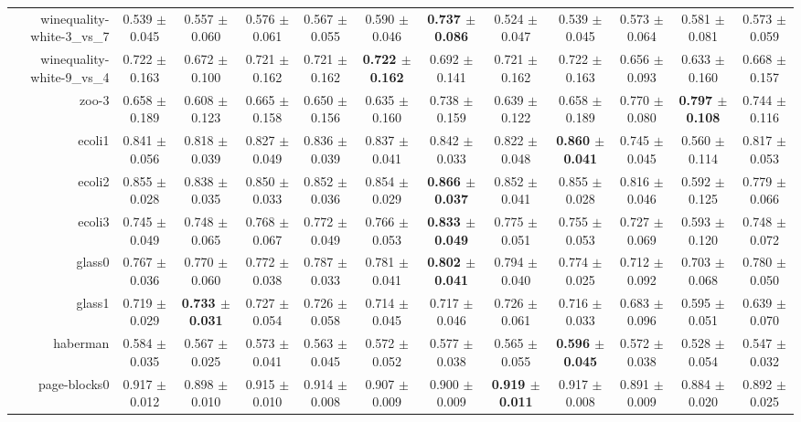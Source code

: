\begin{table}[!ht]
{\begin{tabular}{r c c c c c c c c c c c}
winequality-white-3\_vs\_7 & 0.539 $\pm$ 0.045 & 0.557 $\pm$ 0.060 & 0.576 $\pm$ 0.061 & 0.567 $\pm$ 0.055 & 0.590 $\pm$ 0.046 & \textbf{0.737 $\pm$ 0.086} & 0.524 $\pm$ 0.047 & 0.539 $\pm$ 0.045 & 0.573 $\pm$ 0.064 & 0.581 $\pm$ 0.081 & 0.573 $\pm$ 0.059 \\
winequality-white-9\_vs\_4 & 0.722 $\pm$ 0.163 & 0.672 $\pm$ 0.100 & 0.721 $\pm$ 0.162 & 0.721 $\pm$ 0.162 & \textbf{0.722 $\pm$ 0.162} & 0.692 $\pm$ 0.141 & 0.721 $\pm$ 0.162 & 0.722 $\pm$ 0.163 & 0.656 $\pm$ 0.093 & 0.633 $\pm$ 0.160 & 0.668 $\pm$ 0.157 \\
zoo-3 & 0.658 $\pm$ 0.189 & 0.608 $\pm$ 0.123 & 0.665 $\pm$ 0.158 & 0.650 $\pm$ 0.156 & 0.635 $\pm$ 0.160 & 0.738 $\pm$ 0.159 & 0.639 $\pm$ 0.122 & 0.658 $\pm$ 0.189 & 0.770 $\pm$ 0.080 & \textbf{0.797 $\pm$ 0.108} & 0.744 $\pm$ 0.116 \\
ecoli1 & 0.841 $\pm$ 0.056 & 0.818 $\pm$ 0.039 & 0.827 $\pm$ 0.049 & 0.836 $\pm$ 0.039 & 0.837 $\pm$ 0.041 & 0.842 $\pm$ 0.033 & 0.822 $\pm$ 0.048 & \textbf{0.860 $\pm$ 0.041} & 0.745 $\pm$ 0.045 & 0.560 $\pm$ 0.114 & 0.817 $\pm$ 0.053 \\
ecoli2 & 0.855 $\pm$ 0.028 & 0.838 $\pm$ 0.035 & 0.850 $\pm$ 0.033 & 0.852 $\pm$ 0.036 & 0.854 $\pm$ 0.029 & \textbf{0.866 $\pm$ 0.037} & 0.852 $\pm$ 0.041 & 0.855 $\pm$ 0.028 & 0.816 $\pm$ 0.046 & 0.592 $\pm$ 0.125 & 0.779 $\pm$ 0.066 \\
ecoli3 & 0.745 $\pm$ 0.049 & 0.748 $\pm$ 0.065 & 0.768 $\pm$ 0.067 & 0.772 $\pm$ 0.049 & 0.766 $\pm$ 0.053 & \textbf{0.833 $\pm$ 0.049} & 0.775 $\pm$ 0.051 & 0.755 $\pm$ 0.053 & 0.727 $\pm$ 0.069 & 0.593 $\pm$ 0.120 & 0.748 $\pm$ 0.072 \\
glass0 & 0.767 $\pm$ 0.036 & 0.770 $\pm$ 0.060 & 0.772 $\pm$ 0.038 & 0.787 $\pm$ 0.033 & 0.781 $\pm$ 0.041 & \textbf{0.802 $\pm$ 0.041} & 0.794 $\pm$ 0.040 & 0.774 $\pm$ 0.025 & 0.712 $\pm$ 0.092 & 0.703 $\pm$ 0.068 & 0.780 $\pm$ 0.050 \\
glass1 & 0.719 $\pm$ 0.029 & \textbf{0.733 $\pm$ 0.031} & 0.727 $\pm$ 0.054 & 0.726 $\pm$ 0.058 & 0.714 $\pm$ 0.045 & 0.717 $\pm$ 0.046 & 0.726 $\pm$ 0.061 & 0.716 $\pm$ 0.033 & 0.683 $\pm$ 0.096 & 0.595 $\pm$ 0.051 & 0.639 $\pm$ 0.070 \\
haberman & 0.584 $\pm$ 0.035 & 0.567 $\pm$ 0.025 & 0.573 $\pm$ 0.041 & 0.563 $\pm$ 0.045 & 0.572 $\pm$ 0.052 & 0.577 $\pm$ 0.038 & 0.565 $\pm$ 0.055 & \textbf{0.596 $\pm$ 0.045} & 0.572 $\pm$ 0.038 & 0.528 $\pm$ 0.054 & 0.547 $\pm$ 0.032 \\
page-blocks0 & 0.917 $\pm$ 0.012 & 0.898 $\pm$ 0.010 & 0.915 $\pm$ 0.010 & 0.914 $\pm$ 0.008 & 0.907 $\pm$ 0.009 & 0.900 $\pm$ 0.009 & \textbf{0.919 $\pm$ 0.011} & 0.917 $\pm$ 0.008 & 0.891 $\pm$ 0.009 & 0.884 $\pm$ 0.020 & 0.892 $\pm$ 0.025 \\

\end{tabular}}
\end{table}
